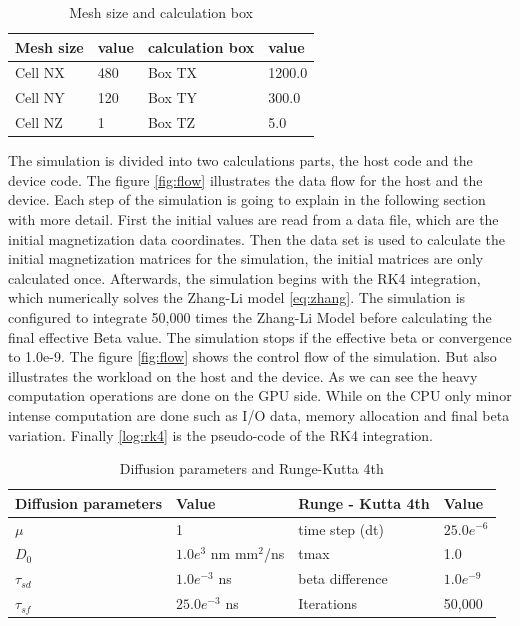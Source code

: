 \begin{table}[h]
\centering
\begin{tabular}{| l | l | l | l |}
\hline
Mesh size & value & calculation box & value \\
\hline
Cell NX & 480 & Box TX  & 1200.0   \\
\hline
Cell NY & 120 & Box TY  & 300.0  \\
\hline
Cell NZ &	1 & Box TZ  & 5.0   \\
\hline
\end{tabular}
\caption{Mesh size and calculation box}
\label{tab:mesh}
\end{table}

The simulation is divided into two calculations parts, the host code and the device code. The figure \ref{fig:flow} illustrates the data flow for the host and the device. Each step of the simulation is going to explain in the following section with more detail. First the initial values are read from a data file, which are the initial magnetization data coordinates. Then the data set is used to calculate the initial magnetization matrices for the simulation, the initial matrices are only calculated once. Afterwards, the simulation begins with the RK4 integration, which numerically solves the  Zhang-Li model \ref{eq:zhang}. The simulation is configured to integrate 50,000 times the Zhang-Li Model before calculating the final effective Beta value. The simulation stops if the effective beta or convergence to 1.0e-9. The figure \ref{fig:flow} shows the control flow of the simulation. But also illustrates the workload on the host and the device. As we can see the heavy computation operations are done on the GPU side. While on the CPU only minor intense computation are done such as I/O data, memory allocation and final beta variation. Finally \ref{log:rk4} is the pseudo-code of the RK4 integration.

\begin{table}[h]
\centering
\begin{tabular}{| l | l | l | l |}
\hline
Diffusion parameters& Value & Runge - Kutta 4th & Value \\
\hline 
$\mu$ & 1 &  time step (dt) &   $25.0e^{-6}$   \\
\hline
$D_{0}$ & $1.0e^{3}$ nm mm$^2$/ns  & tmax  & 1.0  \\
\hline
$\tau_{sd}$ & $1.0e^{-3}$ ns  & beta difference & $1.0e^{-9}$ \\
\hline
$\tau_{sf}$ & $25.0e^{-3}$ ns  & Iterations & 50,000 \\
\hline
\end{tabular}
\caption{Diffusion parameters and Runge-Kutta 4th}
\label{tab:drk}
\end{table}

